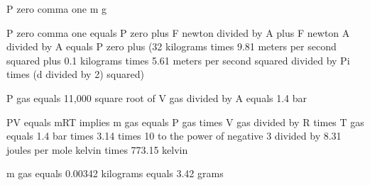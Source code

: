 P zero comma one m g

P zero comma one equals P zero plus F newton divided by A plus F newton A divided by A equals P zero plus (32 kilograms times 9.81 meters per second squared plus 0.1 kilograms times 5.61 meters per second squared divided by Pi times (d divided by 2) squared)

P gas equals 11,000 square root of V gas divided by A equals 1.4 bar

PV equals mRT implies m gas equals P gas times V gas divided by R times T gas equals 1.4 bar times 3.14 times 10 to the power of negative 3 divided by 8.31 joules per mole kelvin times 773.15 kelvin

m gas equals 0.00342 kilograms equals 3.42 grams